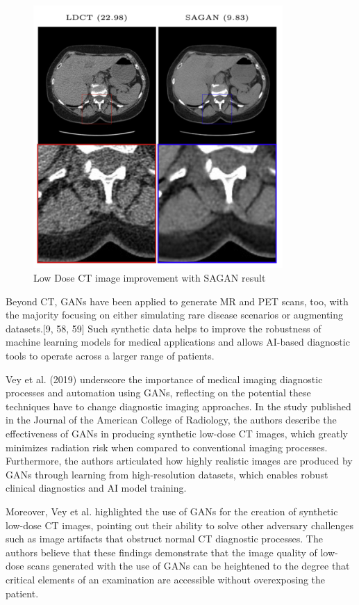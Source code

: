 \documentclass[12pt]{article}
\begin{document}
\begin{figure}[ht]
\includegraphics[width=9.5cm]{resultsVey.png}
\centering
\caption{Low Dose CT image improvement with SAGAN result}
\end{figure}

Beyond CT, GANs have been applied to generate MR and PET scans, too, with the majority focusing on either simulating rare disease scenarios or augmenting datasets.[9, 58, 59] Such synthetic data helps to improve the robustness of machine learning models for medical applications and allows AI-based diagnostic tools to operate across a larger range of patients.

Vey et al. (2019) underscore the importance of medical imaging diagnostic processes and automation using GANs, reflecting on the potential these techniques have to change diagnostic imaging approaches. In the study published in the Journal of the American College of Radiology, the authors describe the effectiveness of GANs in producing synthetic low-dose CT images, which greatly minimizes radiation risk when compared to conventional imaging processes. Furthermore, the authors articulated how highly realistic images are produced by GANs through learning from high-resolution datasets, which enables robust clinical diagnostics and AI model training.

Moreover, Vey et al. highlighted the use of GANs for the creation of synthetic low-dose CT images, pointing out their ability to solve other adversary challenges such as image artifacts that obstruct normal CT diagnostic processes. The authors believe that these findings demonstrate that the image quality of low-dose scans generated with the use of GANs can be heightened to the degree that critical elements of an examination are accessible without overexposing the patient. 
\end{document}
